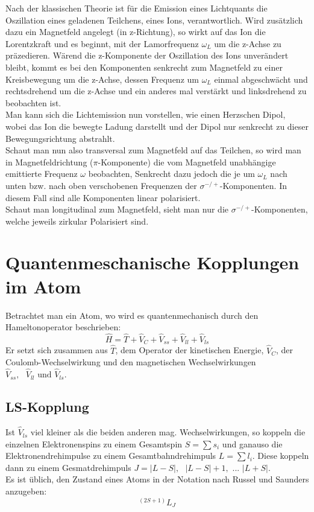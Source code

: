 Nach der klassischen Theorie ist für die Emission eines Lichtquants
die Oszillation eines geladenen Teilchens, eines Ions, verantwortlich.
Wird zusätzlich dazu ein Magnetfeld angelegt (in z-Richtung), so wirkt
auf das Ion die Lorentzkraft und es beginnt, mit der Lamorfrequenz
$\omega_{L}$ um die z-Achse zu präzedieren. Wärend die z-Komponente
der Oszillation des Ions unverändert bleibt, kommt es bei den Komponenten
senkrecht zum Magnetfeld zu einer Kreisbewegung um die z-Achse, dessen
Frequenz um $\omega_{L}$ einmal abgeschwächt und rechtsdrehend um
die z-Achse und ein anderes mal verstärkt und linksdrehend zu beobachten
ist. \\
Man kann sich die Lichtemission nun vorstellen, wie einen Herzschen
Dipol, wobei das Ion die bewegte Ladung darstellt und der Dipol nur
senkrecht zu dieser Bewegungsrichtung abstrahlt. \\
Schaut man nun also transversal zum Magnetfeld auf das Teilchen, so
wird man in Magnetfeldrichtung ($\pi$-Komponente) die vom Magnetfeld
unabhängige emittierte Frequenz $\omega$ beobachten, Senkrecht dazu
jedoch die je um $\omega_{L}$ nach unten bzw. nach oben verschobenen
Frequenzen der $\sigma^{-/+}$-Komponenten. In diesem Fall sind alle
Komponenten linear polarisiert. \\
Schaut man longitudinal zum Magnetfeld, sieht man nur die $\sigma^{-/+}$-Komponenten,
welche jeweils zirkular Polarisiert sind. 


\section{Quantenmeschanische Kopplungen im Atom}

Betrachtet man ein Atom, wo wird es quantenmechanisch durch den Hameltonoperator
beschrieben:
\[
\hat{H}=\hat{T}+\hat{V}_{C}+\hat{V}_{ss}+\hat{V}_{ll}+\hat{V}_{ls}
\]
Er setzt sich zusammen aus $\hat{T}$, dem Operator der kinetischen
Energie, $\hat{V}_{C}$, der Coulomb-Wechselwirkung und den magnetischen
Wechselwirkungen $\hat{V}_{ss},\mbox{ }\hat{V}_{ll}\mbox{ und }\hat{V}_{ls}$.


\subsection{LS-Kopplung}

Ist $\hat{V}_{ls}$ viel kleiner als die beiden anderen mag. Wechselwirkungen,
so koppeln die einzelnen Elektronenspins zu einem Gesamtspin $S=\sum s_{i}$
und ganauso die Elektronendrehimpulse zu einem Gesamtbahndrehimpuls
$L=\sum l_{i}$. Diese koppeln dann zu einem Gesmatdrehimpuls $J=\left|L-S\right|,\mbox{ }\left|L-S\right|+1,\mbox{ ... }\left|L+S\right|$.\\
Es ist üblich, den Zustand eines Atoms in der Notation nach Russel
und Saunders anzugeben:
\[
^{(2S+1)}L_{J}
\]



